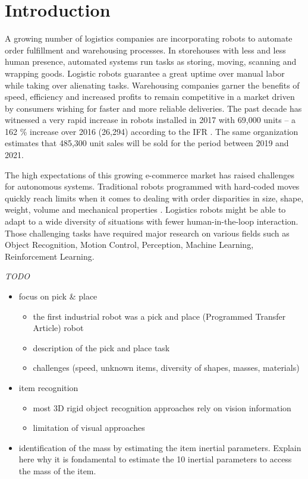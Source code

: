 \documentclass[/home/francois/latex/report/main.tex]{subfiles}
\begin{document}
\chapter{Introduction}

A growing number of logistics companies are incorporating robots to automate order fulfillment and warehousing processes. In storehouses with less and less human presence, automated systems run tasks as storing, moving, scanning and wrapping goods. Logistic robots guarantee a great uptime over manual labor while taking over alienating tasks. Warehousing companies garner the benefits of speed, efficiency and increased profits to remain competitive in a market driven by consumers wishing for faster and more reliable deliveries. The past decade has witnessed a very rapid increase in robots installed in 2017 with 69,000 units – a 162 \% increase over 2016 (26,294) according to the \ac{IFR} \cite{industrialRobot2018}. The same organization estimates that 485,300 unit sales will be sold for the period between 2019 and 2021.

The high expectations of this growing e-commerce market has raised challenges for autonomous systems. Traditional robots programmed with hard-coded moves quickly reach limits when it comes to dealing with order disparities in size, shape, weight, volume and mechanical properties \cite{GQHuang2015}. Logistics robots might be able to adapt to a wide diversity of situations with fewer human-in-the-loop interaction. Those challenging tasks have required major research on various fields such as Object Recognition, Motion Control, Perception, Machine Learning, Reinforcement Learning.

\vspace{1cm}

\textit{TODO}

{\it
\begin{itemize}
	\item focus on pick \& place
	\begin{itemize}
		\item the first industrial robot was a pick and place (Programmed Transfer Article) robot \cite{Wallen2008}
		\item description of the pick and place task
		\item challenges (speed, unknown items, diversity of shapes, masses, materials)
	\end{itemize}
	\item item recognition
	\begin{itemize}
		\item most 3D rigid object recognition approaches rely on vision information
		\item limitation of visual approaches
	\end{itemize}
	\item identification of the mass by estimating the item inertial parameters. Explain here why it is fondamental to estimate the 10 inertial parameters to access the mass of the item.
\end{itemize}
}
\end{document}
